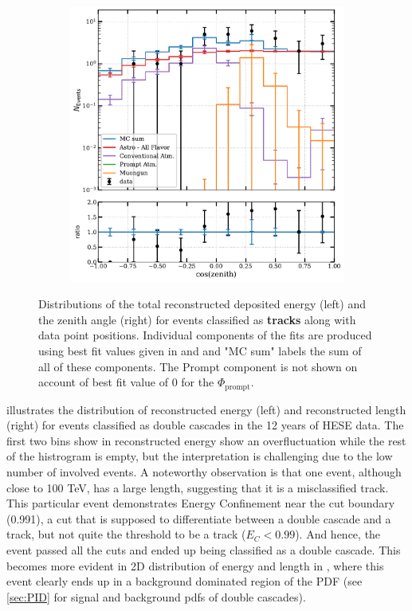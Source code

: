 \begin{figure}[h!]
\begin{subfigure}[h]{0.7\textwidth}
        \includegraphics{./figures/results/DataMC_IC86_pass2_SnowStorm_v2_Bfr_Tracks_zenith.pdf}
       
    \end{subfigure}%
    \caption[Data/MC agreement for HESE-12 Tracks]{Distributions of the total reconstructed deposited energy (left) and the zenith angle (right) for events classified as \textbf{tracks} along with data point positions. Individual components of the fits are produced using best fit values given in  and  and "MC sum" labels the sum of all of these components. The Prompt component is not shown on account of best fit value of 0 for the $\Phi_{\mathrm{prompt}}$.}
\end{figure}
\newpage
{} illustrates the distribution of reconstructed energy (left) and reconstructed length (right) for events classified as double cascades in the 12 years of HESE data. The first two bins show in reconstructed energy show an overfluctuation while the rest of the histrogram is empty, but the interpretation is challenging due to the low number of involved events. A noteworthy observation is that one event, although close to 100 TeV, has a large length, suggesting that it is a misclassified track. This particular event demonstrates Energy Confinement near the cut boundary (0.991), a cut that is supposed to differentiate between a double cascade and a track, but not quite the threshold to be a track ($E_C<0.99$). And hence, the event passed all the cuts and ended up being classified as a double cascade. This becomes more evident in 2D distribution of energy and length in , where this event clearly ends up in a  background dominated region of the PDF (see \ref{sec:PID} for signal and background pdfs of double cascades). 


